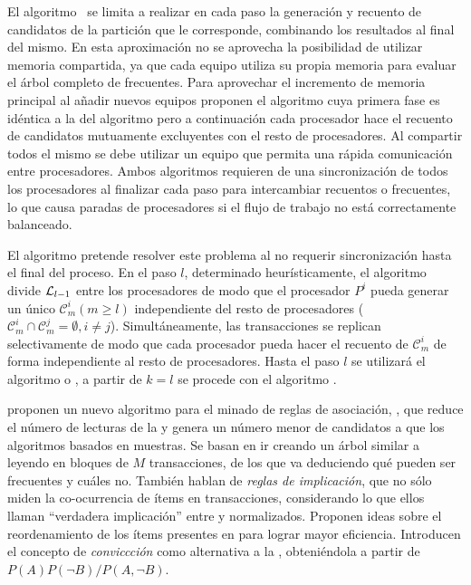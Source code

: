 El algoritmo~%
 se limita a realizar en cada paso la generación y recuento de candidatos de la partición que le corresponde, combinando los resultados al final del mismo. En esta aproximación no se aprovecha la posibilidad de utilizar memoria compartida, ya que cada equipo utiliza su propia memoria para evaluar el árbol completo de \itemsets frecuentes. Para aprovechar el incremento de memoria principal al añadir nuevos equipos proponen el algoritmo  cuya primera fase es idéntica a la del algoritmo  pero a continuación cada procesador hace el recuento de candidatos mutuamente excluyentes con el resto de procesadores. Al compartir todos el mismo \dataset \D se debe utilizar un equipo que permita una rápida comunicación entre procesadores. Ambos algoritmos requieren de una sincronización de todos los procesadores al finalizar cada paso para intercambiar recuentos o \itemsets frecuentes, lo que causa paradas de procesadores si el flujo de trabajo no está correctamente balanceado.

El algoritmo  pretende resolver este problema al no requerir sincronización hasta el final del proceso. En el paso $l$, determinado heurísticamente, el algoritmo divide $\aprioriL[l-1]$ entre los procesadores de modo que el procesador $P^i$ pueda generar un único $\mathcal{C}_m^i (m\geq l)$ independiente del resto de procesadores ($\mathcal{C}_m^i \cap \mathcal{C}_m^j = \emptyset, i\neq j$). Simultáneamente, las transacciones se replican selectivamente de modo que cada procesador pueda hacer el recuento de $\mathcal{C}_m^i$ de forma independiente al resto de procesadores. Hasta el paso $l$ se utilizará el algoritmo  o , a partir de $k=l$ se procede con el algoritmo .





\citet{BrinMotwaniUllmanTsur-DynamicItemsetCounting-1997} proponen un nuevo algoritmo para el minado de reglas de asociación, , que reduce el número de lecturas de la \db y genera un número menor de candidatos a \itemset que los algoritmos basados en muestras. Se basan en ir creando un árbol similar a \aprioriL leyendo \D en bloques de $M$ transacciones, de los que va deduciendo qué \itemsets pueden ser frecuentes y cuáles no. También hablan de \textsl{reglas de implicación}, que no sólo miden la co-ocurrencia de ítems en transacciones, considerando lo que ellos llaman "`verdadera implicación"' entre \antecedentes y \consecuentes normalizados. Proponen ideas sobre el reordenamiento de los ítems presentes en \D para lograr mayor eficiencia. Introducen el concepto de \textsl{conviccción} como alternativa a la \confianza, obteniéndola a partir de $P(A)P(\neg B) / P(A,\neg B)$.


